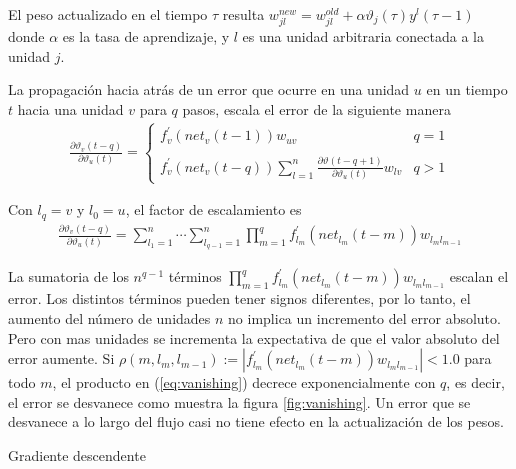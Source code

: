 El peso actualizado en el tiempo $\tau$ resulta $w_{jl}^{new} = w_{jl}^{old} + \alpha\vartheta_{j}(\tau) y^{l}(\tau - 1)$ donde $\alpha$ es la tasa de aprendizaje, y $l$ es una unidad arbitraria conectada a la unidad $j$.

La propagación hacia atrás de un error que ocurre en una unidad $u$ en un tiempo $t$ hacia una unidad $v$ para $q$ pasos, escala el error de la siguiente manera
\begin{eqnarray}
\frac{\partial\vartheta_{v}(t - q)}{\partial\vartheta_{u}(t)} =
\left\{
\begin{array}{lr}
	f^{'}_{v}(net_{v}(t - 1))w_{uv}	& q = 1\\
	\\
	f^{'}_{v}(net_{v}(t - q))\sum^{n}_{l=1}\frac{\partial\vartheta(t - q + 1)}{\partial\vartheta_{u}(t)}w_{lv}	& q > 1
\end{array}
\right.
\end{eqnarray}

Con $l_{q} = v$ y $l_{0} = u$, el factor de escalamiento es
\begin{eqnarray}
\frac{\partial\vartheta_{v}(t - q)}{\partial\vartheta_{u}(t)} =
\sum^{n}_{l_{1}=1}\cdots\sum^{n}_{l_{q - 1}=1}\prod^{q}_{m = 1}f^{'}_{l_{m}}(net_{l_{m}}(t - m))w_{l_{m}l_{m - 1}}\label{eq:vanishing}
\end{eqnarray}

La sumatoria de los $n^{q - 1}$ términos $\prod^{q}_{m = 1}f^{'}_{l_{m}}(net_{l_{m}}(t - m))w_{l_{m}l_{m - 1}}$ escalan el error. Los distintos términos pueden tener signos diferentes, por lo tanto, el aumento del número de unidades $n$ no implica un incremento del error absoluto. Pero con mas unidades se incrementa la expectativa de que el valor absoluto del error aumente. Si $\rho(m, l_{m}, l_{m - 1}) := |f^{'}_{l_{m}}(net_{l_{m}}(t - m))w_{l_{m}l_{m - 1}}| < 1.0$
para todo $m$, el producto en (\ref{eq:vanishing}) decrece exponencialmente con $q$, es decir, el error se desvanece como muestra la figura \ref{fig:vanishing}. Un error que se desvanece a lo largo del flujo casi no tiene efecto en la actualización de los pesos. %

\begin{imagen}
	\scalebox{1.0}{}
	\caption{Gradiente descendente}
	\label{fig:vanishing}
\end{imagen}

